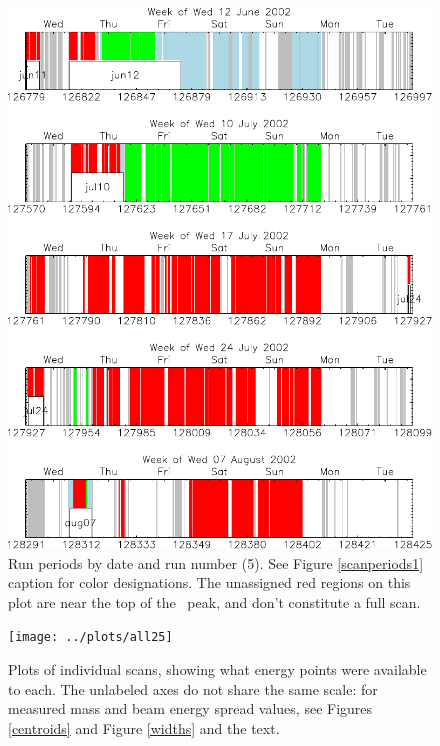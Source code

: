 \documentclass[aps,prd,preprint,superscriptaddress,tightenlines,nofootinbib,floatfix]{revtex4}
\begin{document}
\begin{figure}[p]
  \includegraphics[width=0.95\linewidth]{scan_periods5}
  \caption{\label{scanperiods5} Run periods by date and run number
  (5).  See Figure \ref{scanperiods1} caption for color
  designations.  The unassigned red regions on this plot are near the
  top of the \uthree\ peak, and don't constitute a full scan.}
\end{figure}

\begin{figure}[p]
  \texttt{[image: ../plots/all25]}
  \caption{\label{postage} Plots of individual scans, showing what
    energy points were available to each.  The unlabeled axes do not
    share the same scale: for measured mass and beam energy spread
    values, see Figures \ref{centroids} and Figure \ref{widths} and
    the text.}
\end{figure}
\end{document}
